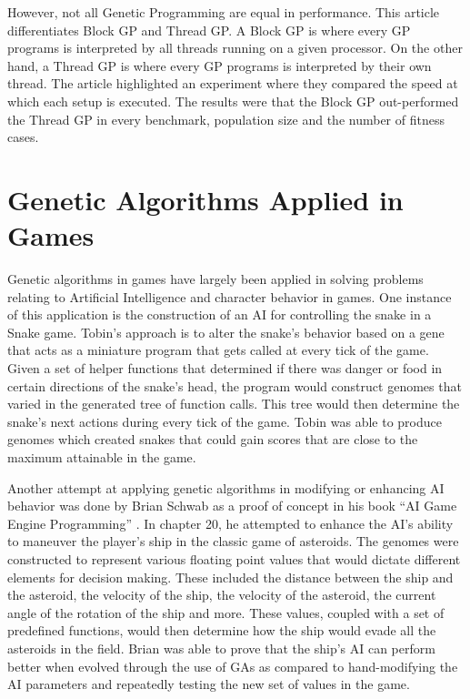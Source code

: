 However, not all Genetic Programming are equal in performance.  This article  differentiates Block GP and Thread GP\cite{Robbilliard09}.  A Block GP is where every GP programs is
interpreted by all threads running on a given processor.  On the other hand, a Thread GP is where every GP programs is interpreted by their own thread.  The article 
highlighted an experiment where they compared the speed at which each setup is executed.  The results were that the Block GP out-performed the Thread GP in every benchmark, 
population size and the number of fitness cases.

\section{Genetic Algorithms Applied in Games}

Genetic algorithms in games have largely been applied in solving problems relating to Artificial Intelligence and character behavior in games. One instance of this application 
is the construction of an AI for controlling the snake in a Snake game\cite{Ehlis00}. Tobin's approach is to alter the snake's behavior based on a gene that acts as a miniature 
program that gets called at every tick of the game. Given a set of helper functions that determined if there was danger or food in certain directions of the snake's head, the program 
would construct genomes that varied in the generated tree of function calls. This tree would then determine the snake's next actions during every tick of the game. Tobin was able to 
produce genomes which created snakes that could gain scores that are close to the maximum attainable in the game.  

Another attempt at applying genetic algorithms in modifying or 
enhancing AI behavior was done by Brian Schwab as a proof of concept in his book “AI Game Engine Programming” \cite{Schwab04}. In chapter 20, he attempted to enhance the AI's ability to maneuver 
the player's ship in the classic game of asteroids. The genomes were constructed to represent various floating point values that would dictate different elements for decision making. 
These included the distance between the ship and the asteroid, the velocity of the ship, the velocity of the asteroid, the current angle of the rotation of the ship and more. 
These values, coupled with a set of predefined functions, would then determine how the ship would evade all the asteroids in the field. Brian was able to prove that the ship's AI can 
perform better when evolved through the use of GAs as compared to hand-modifying the AI parameters and repeatedly testing the new set of values in the game.

